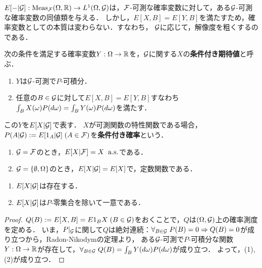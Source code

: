 \documentclass[uplatex,dvipdfmx]{jsreport}
\begin{document}
\begin{tcolorbox}[colframe=ForestGreen, colback=ForestGreen!10!white,breakable,colbacktitle=ForestGreen!40!white,coltitle=black,fonttitle=\bfseries\sffamily,
title=]
    $E[-|\mathcal{G}]:\mathrm{Meas}_{\mathcal{F}}(\Omega,\mathbb{R})\to L^1(\Omega,\mathcal{G})$は，$\mathcal{F}$-可測な確率変数に対して，ある$\mathcal{G}$-可測な確率変数の同値類を与える．
    しかし，$E[X,B]=E[Y,B]$を満たすため，確率変数としての本質は変わらない．すなわち，
    $\mathcal{G}$に応じて，解像度を粗くするのである．
\end{tcolorbox}

\begin{definition}
    次の条件を満足する確率変数$Y:\Omega\to\mathbb{R}$を，$\mathcal{G}$に関する$X$の\textbf{条件付き期待値}と呼ぶ．
    \begin{enumerate}
        \item $Y$は$\mathcal{G}$-可測で$P$-可積分．
        \item 任意の$B\in\mathcal{G}$に対して$E[X,B]=E[Y,B]$すなわち$\int_BX(\omega)P(d\omega)=\int_BY(\omega)P(d\omega)$を満たす．
    \end{enumerate}
    この$Y$を$E[X|\mathcal{G}]$で表す．
    $X$が可測関数の特性関数である場合，$P(A|\mathcal{G}):=E[1_A|\mathcal{G}]\;(A\in\mathcal{F})$を\textbf{条件付き確率}という．
\end{definition}

\begin{example}[自明な例]\mbox{}
    \begin{enumerate}
        \item $\mathcal{G}=\mathcal{F}$のとき，$E[X|\mathcal{F}]=X\;\;\mathrm{a.s.}$である．
        \item $\mathcal{G}=\{\emptyset,\Omega\}$のとき，$E[X|\mathcal{G}]=E[X]$で，定数関数である．
    \end{enumerate}
\end{example}

\begin{lemma}\mbox{}
    \begin{enumerate}
        \item $E[X|\mathcal{G}]$は存在する．
        \item $E[X|\mathcal{G}]$は$P$-零集合を除いて一意である．
    \end{enumerate}
\end{lemma}
\begin{proof}
    $Q(B):=E[X,B]=E{1_BX}\;(B\in\mathcal{G})$をおくことで，$Q$は$(\Omega,\mathcal{G})$上の確率測度を定める．
    いま，$P|_{\mathcal{G}}$に関して$Q$は絶対連続：$\forall_{B\in\mathcal{G}}\;P(B)=0\Rightarrow Q(B)=0$が成り立つから，Radon-Nikodymの定理より，
    ある$\mathcal{G}$-可測で$P$-可積分な関数$Y:\Omega\to\mathbb{R}$が存在して，$\forall_{B\in\mathcal{G}}\;Q(B)=\int_BY(d\omega)P(d\omega)$が成り立つ．
    よって，(1),(2)が成り立つ．
\end{proof}
\end{document}

